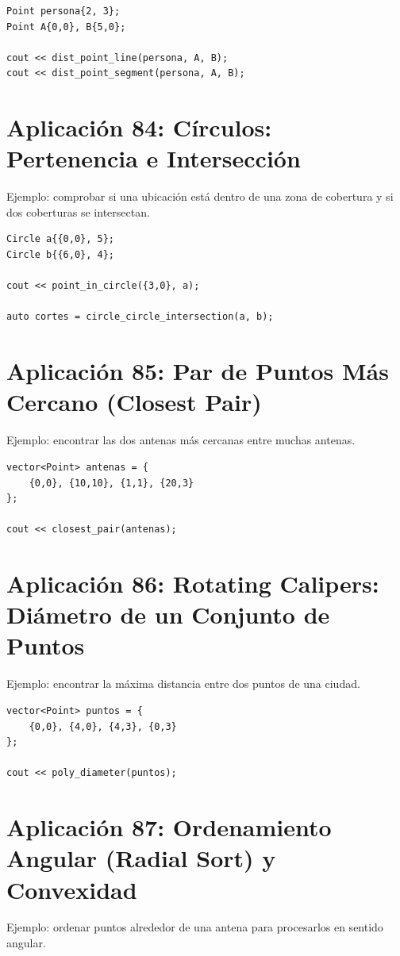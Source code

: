 \documentclass[10pt,twocolumn,letterpaper]{report}
\begin{document}
\begin{lstlisting}
Point persona{2, 3};
Point A{0,0}, B{5,0};

cout << dist_point_line(persona, A, B);
cout << dist_point_segment(persona, A, B);
\end{lstlisting}

\section{Aplicación 84: Círculos: Pertenencia e Intersección}
Ejemplo: comprobar si una ubicación está dentro de una zona de cobertura y si dos coberturas se intersectan.

\begin{lstlisting}
Circle a{{0,0}, 5};
Circle b{{6,0}, 4};

cout << point_in_circle({3,0}, a);

auto cortes = circle_circle_intersection(a, b);
\end{lstlisting}

\section{Aplicación 85: Par de Puntos Más Cercano (Closest Pair)}
Ejemplo: encontrar las dos antenas más cercanas entre muchas antenas.

\begin{lstlisting}
vector<Point> antenas = {
    {0,0}, {10,10}, {1,1}, {20,3}
};

cout << closest_pair(antenas);
\end{lstlisting}

\section{Aplicación 86: Rotating Calipers: Diámetro de un Conjunto de Puntos}
Ejemplo: encontrar la máxima distancia entre dos puntos de una ciudad.

\begin{lstlisting}
vector<Point> puntos = {
    {0,0}, {4,0}, {4,3}, {0,3}
};

cout << poly_diameter(puntos);
\end{lstlisting}

\section{Aplicación 87: Ordenamiento Angular (Radial Sort) y Convexidad}
Ejemplo: ordenar puntos alrededor de una antena para procesarlos en sentido angular.
\end{document}
